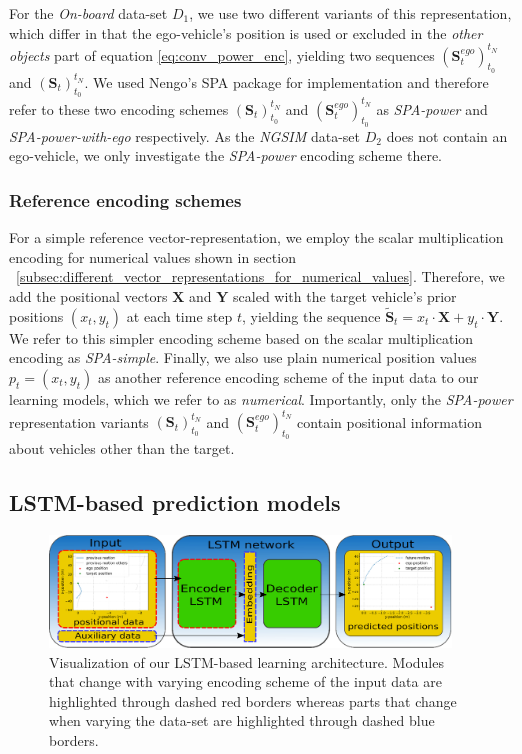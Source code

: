 For the \emph{On-board} data-set $D_1$, we use two different variants of this representation, which differ in that the ego-vehicle's position is used or excluded in the \emph{other objects} part of equation \eqref{eq:conv_power_enc}, yielding two sequences $(\mathbf{S}_{t}^{ego})_{t_0}^{t_N}$ and $(\mathbf{S}_{t})_{t_0}^{t_N}$.
We used \acs{Nengo}'s \ac{SPA} package for implementation and therefore refer to these two encoding schemes $(\mathbf{S}_{t})_{t_0}^{t_N}$ and $(\mathbf{S}_{t}^{ego})_{t_0}^{t_N}$ as \emph{\ac{SPA}-power} and \emph{\ac{SPA}-power-with-ego} respectively.
As the \emph{\ac{NGSIM}} data-set $D_2$ does not contain an ego-vehicle, we only investigate the \emph{\ac{SPA}-power} encoding scheme there.

\subsubsection{Reference encoding schemes}%
\label{ssubsec:reference_encoding_schemes}

For a simple reference vector-representation, we employ the scalar multiplication encoding for numerical values shown in section ~\ref{subsec:different_vector_representations_for_numerical_values}.
Therefore, we add the positional vectors $\mathbf{X}$ and $\mathbf{Y}$ scaled with the target vehicle's prior positions $(x_{t}, y_{t})$ at each time step $t$, yielding the sequence $\tilde{\mathbf{S}}_{t} =  x_{t} \cdot \mathbf{X} + y_{t}\cdot \mathbf{Y}$.
We refer to this simpler encoding scheme based on the scalar multiplication encoding as \emph{\ac{SPA}-simple}.
Finally, we also use plain numerical position values $p_t = (x_{t}, y_{t})$ as another reference encoding scheme of the input data to our learning models, which we refer to as \emph{numerical}.
Importantly, only the \emph{\ac{SPA}-power} representation variants $(\mathbf{S}_{t})_{t_0}^{t_N}$ and $(\mathbf{S}_{t}^{ego})_{t_0}^{t_N}$ contain positional information about vehicles other than the target.

\subsection{\acs{LSTM}-based prediction models}%
\label{subsec:lstm_based_prediction_models}

\begin{figure}[t!]
  \centering
  \includegraphics[width=0.95\textwidth]{imgs/lstm_arch.eps}
  \caption{Visualization of our \ac{LSTM}-based learning architecture. Modules that change with varying encoding scheme of the input data are highlighted through dashed red borders whereas parts that change when varying the data-set are highlighted through dashed blue borders.}\label{fig:lstm_arch}
\end{figure}

